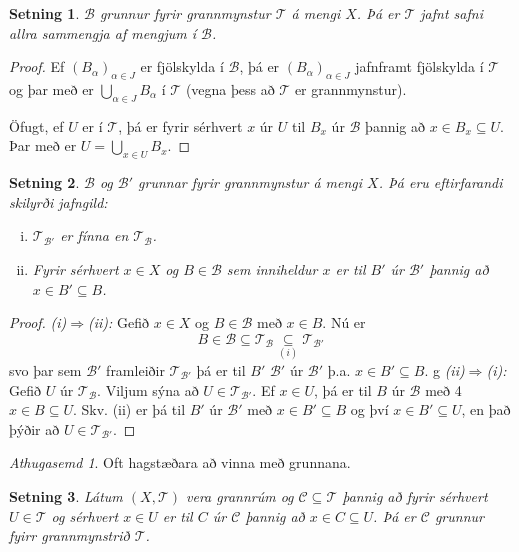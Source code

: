 \documentclass[a4paper,icelandic]{book}
\theoremstyle{definition}
\theoremstyle{plain}
\newtheorem{setn}{Setning}[section]
\theoremstyle{remark}
\newtheorem*{ath}{Athugasemd}
\begin{document}
\begin{setn}
  $\mathcal B$ grunnur fyrir grannmynstur $\mathcal T$ á mengi $X$. Þá er
  $\mathcal T$ jafnt safni allra sammengja af mengjum í $\mathcal B$.
\end{setn}
\begin{proof}
  Ef $(B_\alpha)_{\alpha\in J}$ er fjölskylda í $\mathcal B$, þá er
  $(B_\alpha)_{\alpha\in J}$ jafnframt fjölskylda í $\mathcal T$ og þar með er
  $\bigcup_{\alpha\in J}B_\alpha$ í $\mathcal T$ (vegna þess að $\mathcal T$ er
  grannmynstur).

  Öfugt, ef $U$ er í $\mathcal T$, þá er fyrir sérhvert $x$ úr $U$ til $B_x$ úr
  $\mathcal B$ þannig að $x\in B_x\subseteq U$. Þar með er $U=\bigcup_{x\in U}
  B_x$.
\end{proof}
\begin{setn}
  $\mathcal B$ og $\mathcal B'$ grunnar fyrir grannmynstur á mengi $X$. Þá eru
  eftirfarandi skilyrði jafngild:
  \begin{enumerate}[(i)]
    \item $\mathcal T_{\mathcal B'}$ er fínna en $\mathcal T_{\mathcal B}$.
    \item Fyrir sérhvert $x\in X$ og $B\in \mathcal B$ sem inniheldur $x$ er til
      $B'$ úr $\mathcal B'$ þannig að $x\in B'\subseteq B$.
  \end{enumerate}
\end{setn}
\begin{proof}
  \emph{(i)$\Rightarrow$(ii):} Gefið $x\in X$ og $B\in \mathcal B$ með $x\in B$.
  Nú er
  \[
  B\in \mathcal B\subseteq \mathcal T_{\mathcal B} \underset{(i)}{\subseteq}
  \mathcal T_{\mathcal B'}
  \]
  svo þar sem $\mathcal B'$ framleiðir $\mathcal T_{\mathcal B'}$ þá er til $B'$
  $\mathcal B'$ úr $\mathcal B'$ þ.a. $x\in B'\subseteq B$.  g
  \emph{(ii)$\Rightarrow$(i):} Gefið $U$ úr $\mathcal T_{\mathcal B}$. Viljum
  sýna að $U\in \mathcal T_{\mathcal B'}$. Ef $x\in U$, þá er til $B$ úr
  $\mathcal B$ með 4$x\in B\subseteq U$. Skv. (ii) er þá til $B'$ úr $\mathcal
  B'$ með $x\in B'\subseteq B$ og því $x\in B'\subseteq U$, en það þýðir að
  $U\in \mathcal T_{\mathcal B'}$.
\end{proof}
\begin{ath}
  Oft hagstæðara að vinna með grunnana.
\end{ath}
\begin{setn}
  Látum $(X,\mathcal T)$ vera grannrúm og $\mathcal C\subseteq \mathcal T$
  þannig að fyrir sérhvert $U\in \mathcal T$ og sérhvert $x\in U$ er til $C$ úr
  $\mathcal C$ þannig að $x\in C\subseteq U$. Þá er $\mathcal C$ grunnur fyirr
  grannmynstrið $\mathcal T$.
\end{setn}
\end{document}
